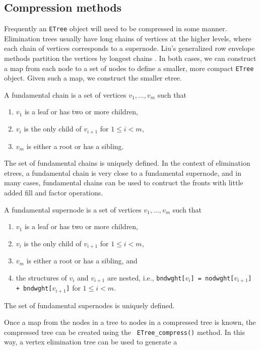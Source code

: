 \subsection{Compression methods}
\label{subsection:ETree:proto:compression}
\par
Frequently an {\tt ETree} object will need to be compressed 
in some manner.
Elimination trees usually have long chains of vertices at the higher
levels, where each chain of vertices corresponds to a supernode.
Liu's generalized row envelope methods partition the vertices by
longest chains \cite{liu91-generalizedEnvelope}.
In both cases, we can construct a map from each node to a set of 
nodes to define a smaller, more compact {\tt ETree} object.
Given such a map, we construct the smaller etree.
\par
A fundamental chain is a set of vertices $v_1, \ldots, v_m$ such that
\begin{enumerate}
\item
$v_1$ is a leaf or has two or more children,
\item
$v_i$ is the only child of $v_{i+1}$ for $1 \le i < m$,
\item
$v_m$ is either a root or has a sibling.
\end{enumerate}
The set of fundamental chains is uniquely defined.
In the context of elimination etrees, a fundamental chain is very
close to a fundamental supernode, and in many cases, 
fundamental chains can be used to contruct the fronts with little 
added fill and factor operations.
\par
A fundamental supernode \cite{ash89-relaxed} is a set of vertices 
$v_1, \ldots, v_m$ such that
\begin{enumerate}
\item
 $v_1$ is a leaf or has two or more children,
\item
 $v_i$ is the only child of $v_{i+1}$ for $1 \le i < m$,
\item
$v_m$ is either a root or has a sibling, and
\item
the structures of $v_i$ and $v_{i+1}$ are nested,
i.e.,
{\tt bndwght[$v_i$] =
nodwght[$v_{i+1}$] + bndwght[$v_{i+1}$]} for $1 \le i < m$.
\end{enumerate}
The set of fundamental supernodes is uniquely defined.
\par
Once a map from the nodes in a tree to nodes in a compressed tree
is known, the compressed tree can be created using the {\tt
ETree\_compress()} method.
In this way, a vertex elimination tree can be used to generate a

